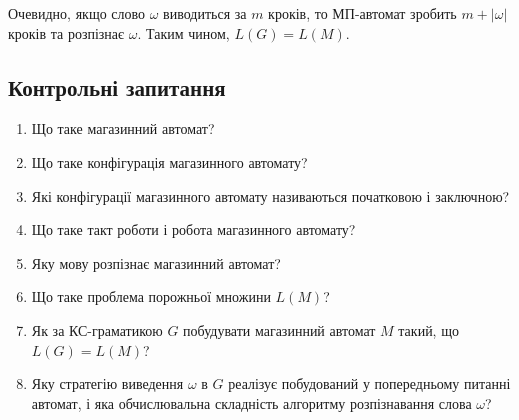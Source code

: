 Очевидно, якщо слово $\omega$ виводиться за $m$ кроків, то МП-автомат зробить $m + |\omega|$ кроків та розпізнає $\omega$. Таким чином, $L(G) = L(M)$.

\subsection{Контрольні запитання}

\begin{enumerate}
	\item Що таке магазинний автомат? %
	\item Що таке конфігурація магазинного автомату? %
	\item Які конфігурації магазинного автомату називаються початковою і заключною? %
	\item Що таке такт роботи і робота магазинного автомату? %
	\item Яку мову розпізнає магазинний автомат? %
	\item Що таке проблема порожньої множини $L(M)$? %
	\item Як за КС-граматикою $G$ побудувати магазинний автомат $M$ такий, що $L(G) = L(M)$?
	\item Яку стратегію виведення $\omega$ в $G$ реалізує побудований у попередньому питанні автомат, і яка обчислювальна складність алгоритму розпізнавання слова $\omega$? %
\end{enumerate}